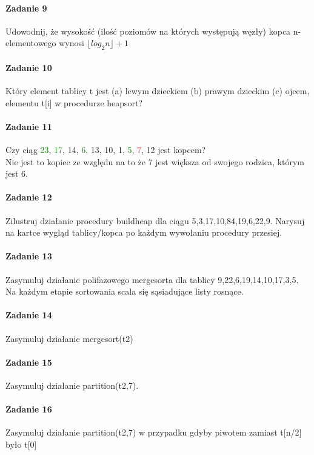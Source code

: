 \documentclass[18pt]{extarticle}
\begin{document}
\paragraph{Zadanie 9} Udowodnij, że wysokość (ilość poziomów na których występują węzły) kopca n-elementowego wynosi $\lfloor log_2 n \rfloor + 1$ \\


\paragraph{Zadanie 10} Który element tablicy t jest (a) lewym dzieckiem (b) prawym dzieckim (c) ojcem, elementu t[i] w procedurze heapsort?


\paragraph{Zadanie 11} Czy ciąg {\textcolor{green}{23}, \textcolor{green}{17}, 14, \textcolor{green}{6}, 13, 10, 1, \textcolor{green}{5}, \textcolor{red}{7}, 12} jest kopcem? \\

Nie jest to kopiec ze względu na to że 7 jest większa od swojego rodzica, którym jest 6. \\ 

\paragraph{Zadanie 12} Zilustruj działanie procedury buildheap dla ciągu {5,3,17,10,84,19,6,22,9}. Narysuj na kartce wygląd tablicy/kopca po każdym wywołaniu procedury przesiej.

\paragraph{Zadanie 13} Zasymuluj działanie polifazowego mergesorta dla tablicy {9,22,6,19,14,10,17,3,5}. Na każdym etapie sortowania scala się sąsiadujące listy rosnące.

\paragraph{Zadanie 14} Zasymuluj działanie mergesort(t2)

\paragraph{Zadanie 15} Zasymuluj działanie partition(t2,7).

\paragraph{Zadanie 16} Zasymuluj działanie partition(t2,7) w przypadku gdyby piwotem zamiast t[n/2] było t[0]
\end{document}
